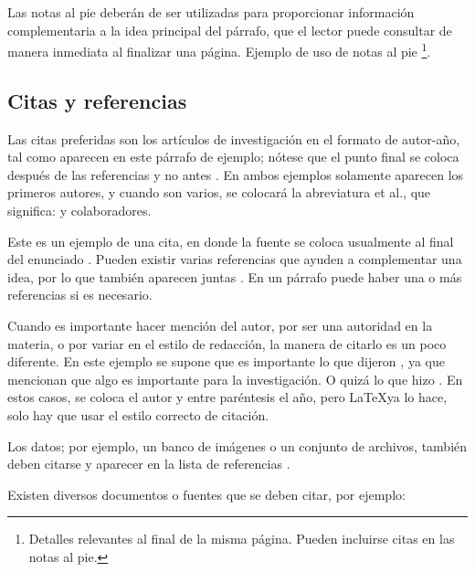 Las notas al pie deberán de ser utilizadas para proporcionar información complementaria a la idea principal del párrafo, que el lector puede consultar de manera inmediata al finalizar una página. Ejemplo de uso de notas al pie \footnote{Detalles relevantes al final de la misma página. Pueden incluirse citas en las notas al pie.}.

\subsection {Citas y referencias}





Las citas preferidas son los artículos de investigación en el formato de autor-año, tal como aparecen en este párrafo de ejemplo; nótese que el punto final se coloca después de las referencias y no antes \citep{bib1,bib2}. En ambos ejemplos solamente aparecen los primeros autores, y cuando son varios, se colocará la abreviatura et al., que significa: y colaboradores.

Este es un ejemplo de una cita, en donde la fuente se coloca usualmente al final del enunciado \citep{bib8}. Pueden existir varias referencias que ayuden a complementar una idea, por lo que también aparecen juntas \citep{bib3,bib11,bib12}. En un párrafo puede haber una o más referencias si es necesario.  

Cuando es importante hacer mención del autor, por ser una autoridad en la materia, o por variar en el estilo de redacción, la manera de citarlo es un poco diferente. En este ejemplo se supone que es importante lo que dijeron \citet{bib4}, ya que mencionan que algo es importante para la investigación. O quizá lo que hizo \citet{bib12}. En estos casos, se coloca el autor y entre paréntesis el año, pero \LaTeX ya lo hace, solo hay que usar el estilo correcto de citación.   

Los datos; por ejemplo, un banco de imágenes o un conjunto de archivos, también deben citarse y aparecer en la lista de referencias \citep{bib9}.

Existen diversos documentos o fuentes que se deben citar, por ejemplo:

